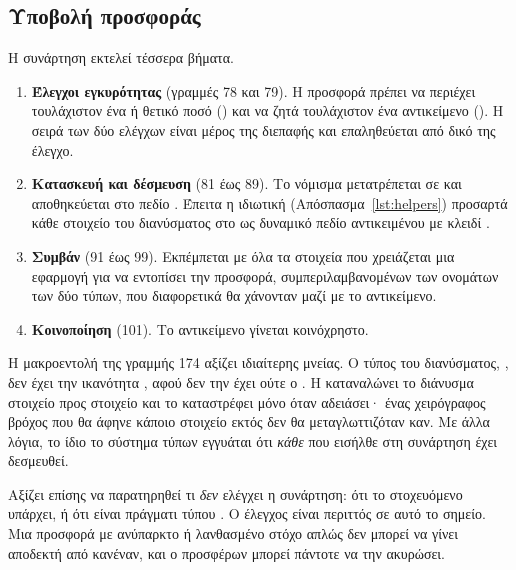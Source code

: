 \subsection{Υποβολή προσφοράς}
\label{sec:place-bid}



Η συνάρτηση εκτελεί τέσσερα βήματα.

\begin{enumerate}[nosep]
  \item \textbf{Έλεγχοι εγκυρότητας} (γραμμές 78 και 79). Η προσφορά πρέπει να περιέχει
        τουλάχιστον ένα  ή θετικό ποσό () και να ζητά τουλάχιστον
        ένα αντικείμενο (). Η σειρά των δύο ελέγχων είναι
        μέρος της διεπαφής και επαληθεύεται από δικό της έλεγχο.
  \item \textbf{Κατασκευή και δέσμευση} (81 έως 89). Το νόμισμα μετατρέπεται σε
         και αποθηκεύεται στο πεδίο . Έπειτα η ιδιωτική
         (Απόσπασμα~\ref{lst:helpers}) προσαρτά κάθε στοιχείο του διανύσματος
        στο  ως δυναμικό πεδίο αντικειμένου με κλειδί .
  \item \textbf{Συμβάν} (91 έως 99). Εκπέμπεται  με όλα τα στοιχεία που
        χρειάζεται μια εφαρμογή για να εντοπίσει την προσφορά, συμπεριλαμβανομένων των
        ονομάτων των δύο τύπων, που διαφορετικά θα χάνονταν μαζί με το αντικείμενο.
  \item \textbf{Κοινοποίηση} (101). Το αντικείμενο γίνεται κοινόχρηστο.
\end{enumerate}

Η μακροεντολή  της γραμμής 174 αξίζει ιδιαίτερης μνείας. Ο τύπος του
διανύσματος, , δεν έχει την ικανότητα , αφού δεν την έχει
ούτε ο . Η  καταναλώνει το διάνυσμα στοιχείο προς στοιχείο και το καταστρέφει μόνο
όταν αδειάσει· ένας χειρόγραφος βρόχος που θα άφηνε κάποιο στοιχείο εκτός δεν θα
μεταγλωττιζόταν καν. Με άλλα λόγια, το ίδιο το σύστημα τύπων εγγυάται ότι \emph{κάθε}
 που εισήλθε στη συνάρτηση έχει δεσμευθεί.

Αξίζει επίσης να παρατηρηθεί τι \emph{δεν} ελέγχει η συνάρτηση: ότι το στοχευόμενο
 υπάρχει, ή ότι είναι πράγματι τύπου . Ο έλεγχος είναι περιττός σε
αυτό το σημείο. Μια προσφορά με ανύπαρκτο ή λανθασμένο στόχο απλώς δεν μπορεί να γίνει
αποδεκτή από κανέναν, και ο προσφέρων μπορεί πάντοτε να την ακυρώσει.

